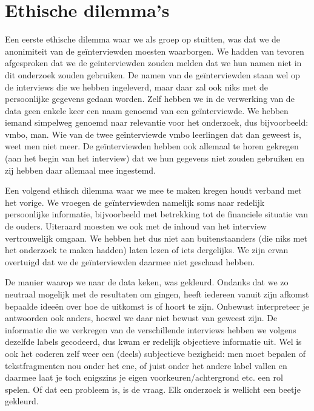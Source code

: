 \documentclass[a4paper,12pt]{memoir}
\begin{document}
\section{Ethische dilemma's}

Een eerste ethische dilemma waar we als groep op stuitten, was dat we de anonimiteit van de geïnterviewden moesten waarborgen. We hadden van tevoren afgesproken dat we de geïnterviewden zouden melden dat we hun namen niet in dit onderzoek zouden gebruiken. De namen van de geïnterviewden staan wel op de interviews die we hebben ingeleverd, maar daar zal ook niks met de persoonlijke gegevens gedaan worden. Zelf hebben we in de verwerking van de data geen enkele keer een naam genoemd van een geïnterviewde. We hebben iemand simpelweg genoemd naar relevantie voor het onderzoek, dus bijvoorbeeld: vmbo, man. Wie van de twee geïnterviewde vmbo leerlingen dat dan geweest is, weet men niet meer. De geïnterviewden hebben ook allemaal te horen gekregen (aan het begin van het interview) dat we hun gegevens niet zouden gebruiken en zij hebben daar allemaal mee ingestemd.

Een volgend ethisch dilemma waar we mee te maken kregen houdt verband met het vorige. We vroegen de geïnterviewden namelijk soms naar redelijk persoonlijke informatie, bijvoorbeeld met betrekking tot de financiele situatie van de ouders. Uiteraard moesten we ook met de inhoud van het interview vertrouwelijk omgaan. We hebben het dus niet aan buitenstaanders (die niks met het onderzoek te maken hadden) laten lezen of iets dergelijks. We zijn ervan overtuigd dat we de geïnterviewden daarmee niet geschaad hebben.

De manier waarop we naar de data keken, was gekleurd. Ondanks dat we zo neutraal mogelijk met de resultaten om gingen, heeft iedereen vanuit zijn afkomst bepaalde ideeën over hoe de uitkomst is of hoort te zijn. Onbewust interpreteer je antwoorden ook anders, hoewel we daar niet bewust van geweest zijn. De informatie die we verkregen van de verschillende interviews hebben we volgens dezelfde labels gecodeerd, dus kwam er redelijk objectieve informatie uit. Wel is ook het coderen zelf weer een (deels) subjectieve bezigheid: men moet bepalen of tekstfragmenten nou onder het ene, of juist onder het andere label vallen en daarmee laat je toch enigszins je eigen voorkeuren/achtergrond etc. een rol spelen. Of dat een probleem is, is de vraag. Elk onderzoek is wellicht een beetje gekleurd.

\end{document}
